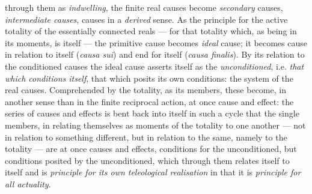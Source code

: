 \documentclass[12pt,a4paper]{book}
\begin{document}
through them as \emph{indwelling}, the finite real causes become
\emph{secondary} causes, \emph{intermediate causes}, causes in a
\emph{derived} sense. As the principle for the active totality of the
essentially connected reals --- for that totality which, as being in its
moments, is itself --- the primitive cause becomes \emph{ideal} cause; it
becomes cause in relation to itself (\emph{\textit{causa sui}}) and end for
itself (\emph{\textit{causa finalis}}). By its relation to the conditioned
causes the ideal cause asserts itself as the \emph{unconditioned}, i.e.
\emph{that which conditions itself}, that which posits its own conditions: the
system of the real causes. Comprehended by the totality, as its members, these
become, in another sense than in the finite reciprocal action, at once cause
and effect: the series of causes and effects is bent back into itself in such
a cycle that the single members, in relating themselves as moments of the
totality to one another --- not in relation to something different, but in
relation to the same, namely to the totality --- are at once causes and
effects, conditions for the unconditioned, but conditions posited by the
unconditioned, which through them relates itself to itself and is
\emph{principle for its own teleological realisation} in that it is
\emph{principle for all actuality}.
\end{document}
